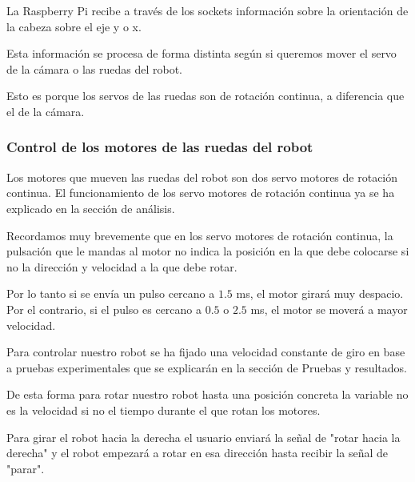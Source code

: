 \documentclass[twoside, 12pt]{epstfg}
\begin{document}
La Raspberry Pi recibe a través de los sockets información sobre la orientación de la cabeza sobre el eje y o x.


Esta información se procesa de forma distinta según si queremos mover el servo de la cámara o las ruedas del robot.

Esto es porque los servos de las ruedas son de rotación continua, a diferencia que el de la cámara.

\subsubsection{\textbf{Control de los motores de las ruedas del robot}}

Los motores que mueven las ruedas del robot son dos servo motores de rotación continua. El funcionamiento de los servo motores de rotación continua ya se ha explicado en la sección de análisis.

Recordamos muy brevemente que en los servo motores de rotación continua, la pulsación que le mandas al motor no indica la posición en la que debe colocarse si no la dirección y velocidad a la que debe rotar.

Por lo tanto si se envía un pulso cercano a $1.5$ ms, el motor girará muy despacio. Por el contrario, si el pulso es cercano a $0.5$ o $2.5$ ms, el motor se moverá a mayor velocidad.

Para controlar nuestro robot se ha fijado una velocidad constante de giro en base a pruebas experimentales que se explicarán en la sección de Pruebas y resultados.

De esta forma para rotar nuestro robot hasta una posición concreta la variable no es la velocidad si no el tiempo durante el que rotan los motores.

Para girar el robot hacia la derecha el usuario enviará la señal de "rotar hacia la derecha" y el robot empezará a rotar en esa dirección hasta recibir la señal de "parar".

%
%
%
\end{document}
